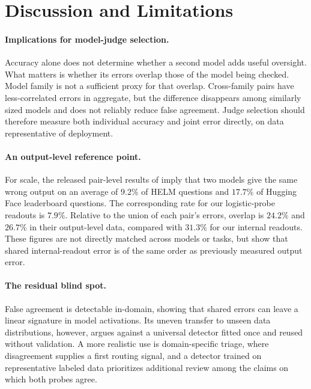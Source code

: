\section{Discussion and Limitations}
\label{sec:discussion}

\paragraph{Implications for model-judge selection.}
Accuracy alone does not determine whether a second model adds useful oversight.
What matters is whether its errors overlap those of the model being checked.
Model family is not a sufficient proxy for that overlap. Cross-family pairs
have less-correlated errors in aggregate, but the difference disappears among
similarly sized models and does not reliably reduce false agreement. Judge
selection should therefore measure both individual accuracy and joint error
directly, on data representative of deployment.

\paragraph{An output-level reference point.}
For scale, the released pair-level results of \citet{kim2025correlated} imply
that two models give the same wrong output on an average of $9.2\%$ of HELM
questions and $17.7\%$ of Hugging Face leaderboard questions. The corresponding
rate for our logistic-probe readouts is $7.9\%$. Relative to the union of each
pair's errors, overlap is $24.2\%$ and $26.7\%$ in their output-level data,
compared with $31.3\%$ for our internal readouts. These figures are not directly
matched across models or tasks, but show that shared internal-readout error is
of the same order as previously measured output error.

\paragraph{The residual blind spot.}
False agreement is detectable in-domain, showing that shared errors can leave a
linear signature in model activations. Its uneven transfer to unseen data
distributions, however, argues against a universal detector fitted once and
reused without validation. A more realistic use is domain-specific triage, where
disagreement supplies a first routing signal, and a detector trained on
representative labeled data prioritizes additional review among the claims on
which both probes agree.

